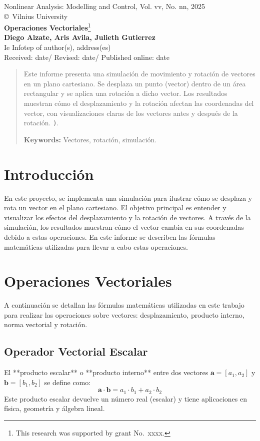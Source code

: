 \documentclass[a4paper, 10pt]{article}
\begin{document}
\begin{center}
Nonlinear Analysis: Modelling and Control, Vol. vv, No. nn, 2025\\
\copyright\ Vilnius University\\[24pt]
\LARGE
\textbf{Operaciones Vectoriales}\footnote{This research was supported by grant No.\ xxxx.}\\[6pt]
\small
\textbf{Diego Alzate, Aris Avila, Julieth Gutierrez}\\[6pt]
Ie Infotep of author(s), address(es) \\[6pt]
Received: date\quad/\quad
Revised: date\quad/\quad
Published online: date
\end{center}

\begin{abstract}
Este informe presenta una simulación de movimiento y rotación de vectores en un plano cartesiano. Se desplaza un punto (vector) dentro de un área rectangular y se aplica una rotación a dicho vector. Los resultados muestran cómo el desplazamiento y la rotación afectan las coordenadas del vector, con visualizaciones claras de los vectores antes y después de la rotación. \texttt). \vskip 2mm

\textbf{Keywords:} Vectores, rotación, simulación.
\end{abstract}

\nocite{2009ProcDETAp}

\section{Introducción}\label{s:1}
En este proyecto, se implementa una simulación para ilustrar cómo se desplaza y rota un vector en el plano cartesiano. El objetivo principal es entender y visualizar los efectos del desplazamiento y la rotación de vectores. A través de la simulación, los resultados muestran cómo el vector cambia en sus coordenadas debido a estas operaciones. En este informe se describen las fórmulas matemáticas utilizadas para llevar a cabo estas operaciones.

\section{Operaciones Vectoriales}\label{s:2}
A continuación se detallan las fórmulas matemáticas utilizadas en este trabajo para realizar las operaciones sobre vectores: desplazamiento, producto interno, norma vectorial y rotación.

\subsection{Operador Vectorial Escalar}\label{s:2.1}
El **producto escalar** o **producto interno** entre dos vectores \( \mathbf{a} = [a_1, a_2] \) y \( \mathbf{b} = [b_1, b_2] \) se define como:
\[
\mathbf{a} \cdot \mathbf{b} = a_1 \cdot b_1 + a_2 \cdot b_2
\]
Este producto escalar devuelve un número real (escalar) y tiene aplicaciones en física, geometría y álgebra lineal.
\end{document}
